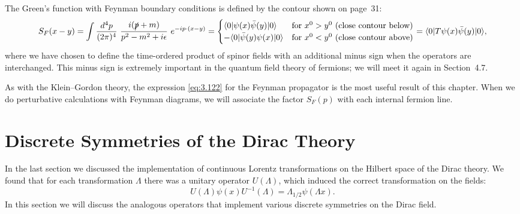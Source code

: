 The Green's function with Feynman boundary conditions is defined by the
contour shown on page~31:
\begin{equation}
  S_F(x-y) = \int \frac{d^4p}{(2\pi)^4}\
    \frac{i(\slashed{p} + m)}{p^2 - m^2 + i\epsilon}\ e^{-ip\cdot(x-y)}
  = \begin{cases}
      \langle 0|\psi(x)\bar{\psi}(y)|0\rangle & \text{for } x^0>y^0
        \text{ (close contour below)}\\
      -\langle 0|\bar{\psi}(y)\psi(x)|0\rangle & \text{for } x^0<y^0
        \text{ (close contour above)}
    \end{cases}
  = \langle 0|T\psi(x)\bar{\psi}(y)|0\rangle ,
  \label{eq:3.122}
\end{equation}
where we have chosen to define the time-ordered product of spinor fields with
an additional minus sign when the operators are interchanged.  This minus
sign is extremely important in the quantum field theory of fermions; we will
meet it again in Section~4.7.

As with the Klein--Gordon theory, the expression \eqref{eq:3.122} for the
Feynman propagator is the most useful result of this chapter.  When we do
perturbative calculations with Feynman diagrams, we will associate the factor
$S_F(p)$ with each internal fermion line.

\section{Discrete Symmetries of the Dirac Theory}

In the last section we discussed the implementation of continuous Lorentz
transformations on the Hilbert space of the Dirac theory.  We found that for
each transformation $\Lambda$ there was a unitary operator $U(\Lambda)$, which
induced the correct transformation on the fields:
\begin{equation}
  U(\Lambda)\psi(x)U^{-1}(\Lambda) = \Lambda_{1/2}\psi(\Lambda x).
  \label{eq:3.123}
\end{equation}
In this section we will discuss the analogous operators that implement various
discrete symmetries on the Dirac field.

